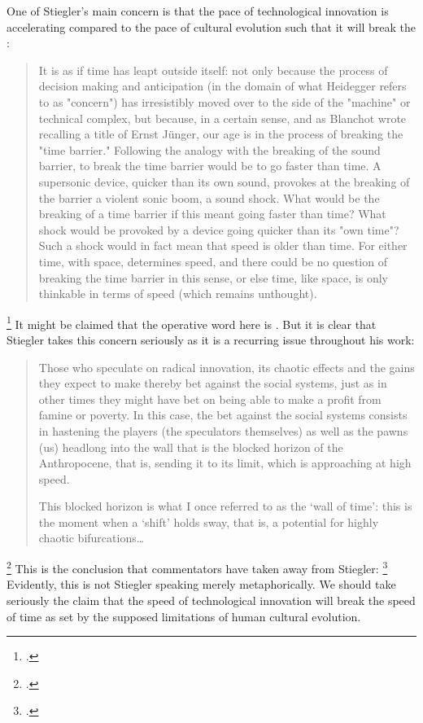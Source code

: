 \documentclass[letterpaper,notitlepage,12pt]{article}
\begin{document}
One of Stiegler's main concern is that the pace of technological innovation is
accelerating compared to the pace of cultural evolution such that it will break
the : \blockquote{It is as if time has leapt outside 
  itself: not only because the process of decision making and anticipation (in 
  the domain of what Heidegger refers to as "concern") has irresistibly moved 
  over to the side of the "machine" or technical complex, but because, in a 
  certain sense, and as Blanchot wrote recalling a title of Ernst Jünger, our 
  age is in the process of breaking the "time barrier." Following the analogy 
  with the breaking of the sound barrier, to break the time barrier would be to 
  go faster than time. A supersonic device, quicker than its own sound, provokes
  at the breaking of the barrier a violent sonic boom, a sound shock. What would 
  be the breaking of a time barrier if this meant going faster than time? What 
  shock would be provoked by a device going quicker than its "own time"? Such a 
  shock would in fact mean that speed is older than time. For either time, with 
  space, determines speed, and there could be no question of breaking the time 
  barrier in this sense, or else time, like space, is only thinkable in terms of
speed (which remains unthought).}\footcite[p. 15]{stiegler_technics_1998}
It might be claimed that the operative word here is .
But it is clear that Stiegler takes this concern seriously as it is a recurring
issue throughout his work: \blockquote{Those who speculate on radical 
  innovation, its chaotic effects and the gains they expect to make thereby bet 
  against the social systems, just as in other times they might have bet on 
  being able to make a profit from famine or poverty. In this case, the bet 
  against the social systems consists in hastening the players (the speculators 
  themselves) as well as the pawns (us) headlong into the wall that is the 
  blocked horizon of the Anthropocene, that is, sending it to its limit, which 
  is approaching at high speed. 

  This blocked horizon is what I once referred to as the ‘wall of time’: this is
  the moment when a ‘shift’ holds sway, that is, a potential for highly chaotic 
bifurcations\ldots}\footcite[ch. 5.26]{stiegler_age_2019}
This is the conclusion that commentators have taken away from
Stiegler: \footcite[p. 148]{bishop_building_2020}
Evidently, this is not Stiegler speaking merely metaphorically.
We should take seriously the claim that the speed of technological innovation
will break the speed of time as set by the supposed limitations of human
cultural evolution.
\end{document}
